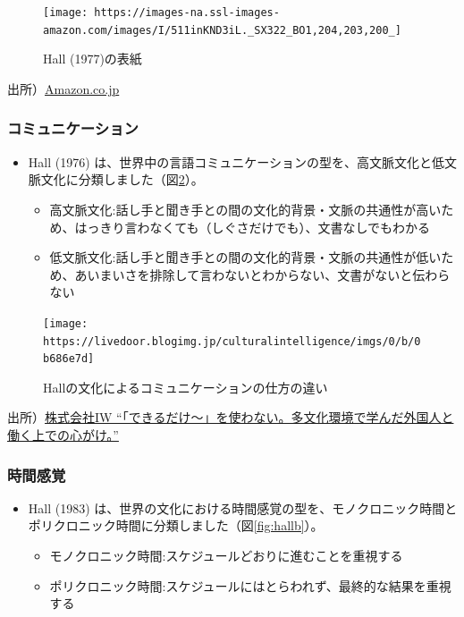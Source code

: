 \documentclass[
]{book}
\begin{document}
\begin{figure}
\texttt{[image: https://images-na.ssl-images-amazon.com/images/I/511inKND3iL.\_SX322\_BO1,204,203,200\_]} \caption{Hall (1977)の表紙}\label{fig:hall}
\end{figure}

出所）\href{https://www.amazon.co.jp/Beyond-Culture-Edward-T-Hall/dp/0385124740}{Amazon.co.jp}

\hypertarget{ux30b3ux30dfux30e5ux30cbux30b1ux30fcux30b7ux30e7ux30f3}{%
\subsubsection{コミュニケーション}\label{ux30b3ux30dfux30e5ux30cbux30b1ux30fcux30b7ux30e7ux30f3}}

\begin{itemize}
\item
  Hall (1976) は、世界中の言語コミュニケーションの型を、高文脈文化と低文脈文化に分類しました（図\ref{fig:halla}）。

  \begin{itemize}
  \item
    高文脈文化:話し手と聞き手との間の文化的背景・文脈の共通性が高いため、はっきり言わなくても（しぐさだけでも）、文書なしでもわかる
  \item
    低文脈文化:話し手と聞き手との間の文化的背景・文脈の共通性が低いため、あいまいさを排除して言わないとわからない、文書がないと伝わらない
  \end{itemize}
\end{itemize}

\begin{figure}
\texttt{[image: https://livedoor.blogimg.jp/culturalintelligence/imgs/0/b/0b686e7d]} \caption{Hallの文化によるコミュニケーションの仕方の違い}\label{fig:halla}
\end{figure}

出所）\href{https://iw-inc.jp/2019/11/09/multienvironment01/}{株式会社IW ``「できるだけ〜」を使わない。多文化環境で学んだ外国人と働く上での心がけ。''}

\hypertarget{ux6642ux9593ux611fux899a}{%
\subsubsection{時間感覚}\label{ux6642ux9593ux611fux899a}}

\begin{itemize}
\item
  Hall (1983) は、世界の文化における時間感覚の型を、モノクロニック時間とポリクロニック時間に分類しました（図\ref{fig:hallb}）。

  \begin{itemize}
  \item
    モノクロニック時間:スケジュールどおりに進むことを重視する
  \item
    ポリクロニック時間:スケジュールにはとらわれず、最終的な結果を重視する
  \end{itemize}
\end{itemize}
\end{document}
